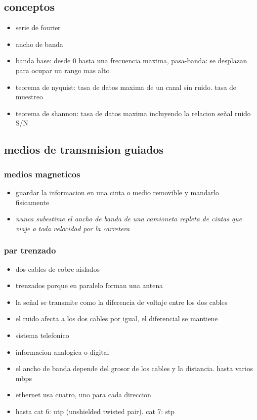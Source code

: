 \documentclass[11pt]{article}
\begin{document}
\subsection{conceptos}
\label{sec:orge8813a4}
\begin{itemize}
\item serie de fourier
\item ancho de banda
\item banda base: desde 0 hasta una frecuencia maxima, pasa-banda: se desplazan para ocupar un rango mas alto
\item teorema de nyquist: tasa de datos maxima de un canal sin ruido. tasa de muestreo
\item teorema de shannon: tasa de datos maxima incluyendo la relacion señal ruido S/N
\end{itemize}
\subsection{medios de transmision guiados}
\label{sec:orgd223ec9}
\subsubsection{medios magneticos}
\label{sec:org79478c4}
\begin{itemize}
\item guardar la informacion en una cinta o medio removible y mandarlo fisicamente
\item \emph{nunca subestime el ancho de banda de una camioneta repleta de cintas que viaje a toda velocidad por la carretera}
\end{itemize}
\subsubsection{par trenzado}
\label{sec:orge2d0ffe}
\begin{itemize}
\item dos cables de cobre aislados
\item trenzados porque en paralelo forman una antena
\item la señal se transmite como la diferencia de voltaje entre los dos cables
\item el ruido afecta a los dos cables por igual, el diferencial se mantiene
\item sistema telefonico
\item informacion analogica o digital
\item el ancho de banda depende del grosor de los cables y la distancia. hasta varios mbps
\item ethernet usa cuatro, uno para cada direccion
\item hasta cat 6: utp (unshielded twisted pair). cat 7: stp
\end{itemize}
\end{document}
